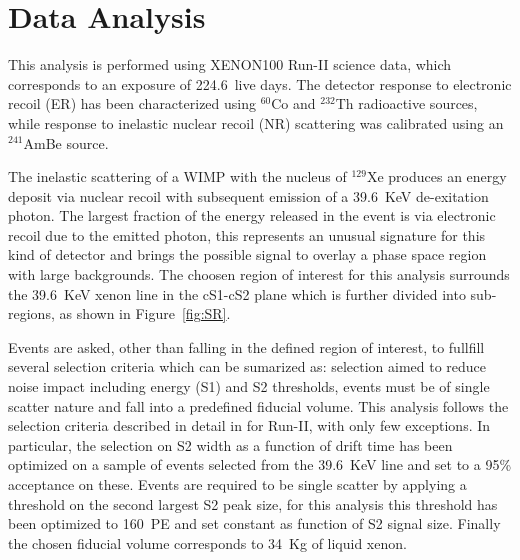 \section{Data Analysis}

This analysis is performed using XENON100 Run-II science data, which corresponds to an exposure of 224.6~live days. The detector response to
electronic recoil (ER) has been characterized using $^{60}$Co and $^{232}$Th radioactive sources, while response to inelastic nuclear recoil (NR)
scattering was calibrated using an $^{241}$AmBe source. 

The inelastic scattering of a WIMP with the nucleus of $^{129}$Xe produces an energy deposit via nuclear recoil with subsequent emission of  
a 39.6~KeV de-exitation photon. 
The largest fraction of the energy released in the event is via electronic recoil due to the emitted photon, this represents an
unusual signature for this kind of detector and brings the possible signal to overlay a phase space region with large backgrounds.
The choosen region of interest for this analysis surrounds the 39.6~KeV xenon line in the cS1-cS2 plane which is further divided into
sub-regions, as shown in Figure~\ref{fig:SR}.

Events are asked, other than falling in the defined region of interest, to fullfill several selection criteria which can be sumarized as:
selection aimed to reduce noise impact including energy (S1) and S2 thresholds, events must be of single scatter nature and fall 
into a predefined fiducial volume. This analysis follows the selection criteria described in detail in \cite{dataAnalysis} for Run-II, 
with only few exceptions. 
In particular, the selection on S2 width as a function of drift time has been optimized on a sample of events selected from the 39.6~KeV line
and set to a 95\% acceptance on these. Events are required to be single scatter by applying a threshold on the 
second largest S2 peak size,  for this analysis this threshold has been optimized to 160~PE and set constant as function of S2 signal size. 
Finally the chosen fiducial volume corresponds to 34~Kg of liquid xenon.



